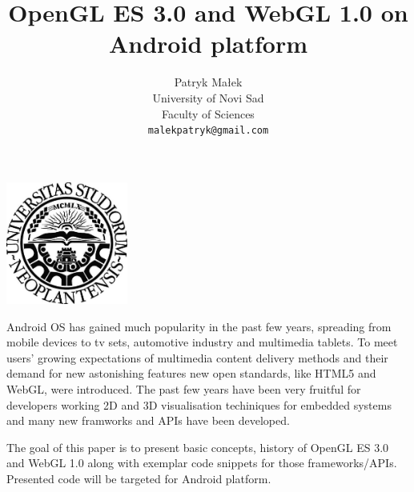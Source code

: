 \documentclass[a4paper,12pt]{article}
\renewenvironment{abstract}
 {\small
  \begin{center}
  \bfseries \abstractname\vspace{-.5em}\vspace{0pt}
  \end{center}
  \list{}{
    \setlength{\leftmargin}{1cm}%
    \setlength{\rightmargin}{\leftmargin}%
  }%
  \item\relax}
 {\endlist}
\begin{document}


\title{OpenGL ES 3.0 and WebGL 1.0 on Android platform}
\author{Patryk Małek\\
        University of Novi Sad\\
        Faculty of Sciences\\
        \texttt{malekpatryk@gmail.com}
        }
\date{}         %
\maketitle

\thispagestyle{empty}



\vspace{5pc}

\centerline{
\includegraphics[width=0.3\textwidth,height=0.3\textheight,keepaspectratio]{NoviSadLogoGray.jpg}
}

\vspace{5pc}

\begin{abstract}
\label{Abstract}
Android OS has gained much popularity in the past few years, spreading from mobile devices to tv sets, automotive industry and multimedia tablets. 
To meet users' growing expectations of multimedia content delivery methods and their demand for new astonishing features new open standards, like HTML5 and WebGL, were introduced. 
The past few years have been very fruitful for developers working 2D and 3D visualisation techiniques for embedded systems and many new framworks and APIs have been developed.

The goal of this paper is to present basic concepts, history of OpenGL ES 3.0 and WebGL 1.0 along with exemplar code snippets for those frameworks/APIs.
Presented code will be targeted for Android platform.
\end{abstract}

\pagebreak
\end{document}
